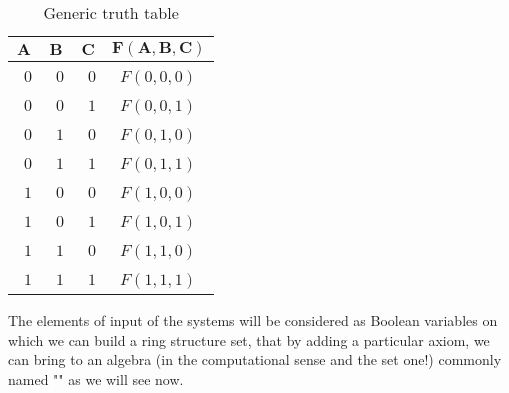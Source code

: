	\begin{table}[H]
		\begin{center}
				\begin{tabular}{|p{2cm}|p{2cm}|p{2cm}|p{2cm}|}
					\hline
					\multicolumn{1}{c}{\cellcolor{black!30}$\pmb{A}$} & 
	  \multicolumn{1}{c}{\cellcolor{black!30}$\pmb{B}$}  & \multicolumn{1}{c}{\cellcolor{black!30}$\pmb{C}$} & \multicolumn{1}{c}{\cellcolor{black!30}$\pmb{F(A,B,C)}$} \\ \hline
					\centering\arraybackslash\ $0$ & \centering\arraybackslash\ $0$ & \centering\arraybackslash\ $0$ & \centering\arraybackslash\ $F(0,0,0)$ \\ \hline
					\centering\arraybackslash\ $0$ & \centering\arraybackslash\ $0$ & \centering\arraybackslash\ $1$ & \centering\arraybackslash\ $F(0,0,1)$ \\ \hline
					\centering\arraybackslash\ $0$ & \centering\arraybackslash\ $1$ & \centering\arraybackslash\ $0$ & \centering\arraybackslash\ $F(0,1,0)$ \\ \hline
					\centering\arraybackslash\ $0$ & \centering\arraybackslash\ $1$ & \centering\arraybackslash\ $1$ & \centering\arraybackslash\ $F(0,1,1)$ \\ \hline
					\centering\arraybackslash\ $1$ & \centering\arraybackslash\ $0$ & \centering\arraybackslash\ $0$ & \centering\arraybackslash\ $F(1,0,0)$ \\ \hline
					\centering\arraybackslash\ $1$ & \centering\arraybackslash\ $0$ & \centering\arraybackslash\ $1$ & \centering\arraybackslash\ $F(1,0,1)$ \\ \hline
					\centering\arraybackslash\ $1$ & \centering\arraybackslash\ $1$ & \centering\arraybackslash\ $0$ & \centering\arraybackslash\ $F(1,1,0)$ \\ \hline
					\centering\arraybackslash\ $1$ & \centering\arraybackslash\ $1$ & \centering\arraybackslash\ $1$ & \centering\arraybackslash\ $F(1,1,1)$  \\ \hline
			\end{tabular}
		\end{center}
		\caption{Generic truth table}
		\end{table}
		The elements of input of the systems will be considered as Boolean variables on which we can build a ring structure set, that by adding a particular axiom, we can bring to an algebra (in the computational sense and the set one!) commonly named "" as we will see now.
		
